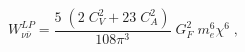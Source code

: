 \begin{equation} 
{W}^{LP}_{\nu {\bar \nu}} 
=
\frac{5\;(2\;C_V^2+23\;C_A^2)}{108\pi^3}\;
G_F^2\;m_e^6\chi^6\;,
\label{W2}
\end{equation} 
